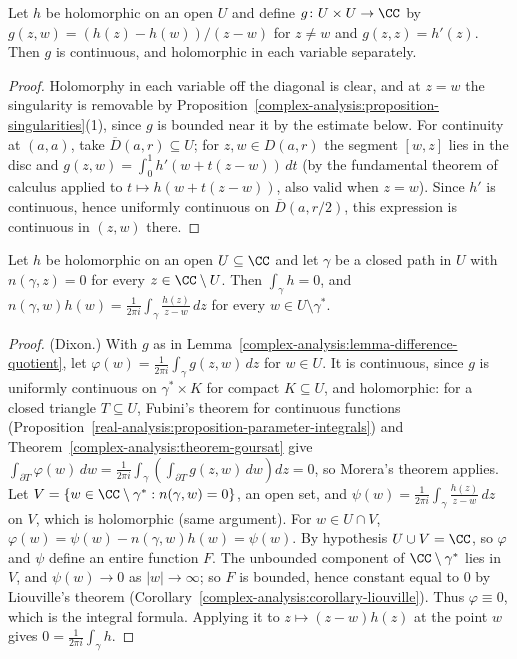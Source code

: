 \begin{lemma}\label{complex-analysis:lemma-difference-quotient}
Let $h$ be holomorphic on an open $U$ and define $g \colon U \times U \to \CC$ by $g(z, w) = (h(z) - h(w))/(z - w)$ for $z \neq w$ and $g(z, z) = h'(z)$. Then $g$ is continuous, and holomorphic in each
variable separately.
\end{lemma}

\begin{proof}
Holomorphy in each variable off the diagonal is clear, and at $z = w$ the singularity is removable by Proposition~\ref{complex-analysis:proposition-singularities}(1), since $g$ is bounded near it by the
estimate below. For continuity at $(a, a)$, take $\overline{D}(a, r) \subseteq U$; for $z, w \in D(a, r)$ the segment $[w, z]$ lies in the disc and
$g(z, w) = \int_0^1h'(w + t(z - w))\,dt$ (by the fundamental theorem of calculus applied to $t \mapsto h(w + t(z - w))$, also valid when $z = w$). Since $h'$ is continuous, hence uniformly continuous on
$\overline{D}(a, r/2)$, this expression is continuous in $(z, w)$ there.
\end{proof}

\begin{theorem}\label{complex-analysis:theorem-cauchy-homology}
Let $h$ be holomorphic on an open $U \subseteq \CC$ and let $\gamma$ be a closed path in $U$ with $n(\gamma, z) = 0$ for every $z \in \CC \setminus U$. Then $\int_\gamma h = 0$, and
$n(\gamma, w)h(w) = \frac{1}{2\pi i}\int_\gamma\frac{h(z)}{z - w}\,dz$ for every $w \in U \setminus \gamma^*$.
\end{theorem}

\begin{proof}
(Dixon.) With $g$ as in Lemma~\ref{complex-analysis:lemma-difference-quotient}, let $\varphi(w) = \frac{1}{2\pi i}\int_\gamma g(z, w)\,dz$ for $w \in U$. It is continuous, since $g$ is uniformly continuous on
$\gamma^* \times K$ for compact $K \subseteq U$, and holomorphic: for a closed triangle $T \subseteq U$, Fubini's theorem for continuous functions
(Proposition~\ref{real-analysis:proposition-parameter-integrals}) and Theorem~\ref{complex-analysis:theorem-goursat} give
$\int_{\partial T}\varphi(w)\,dw = \frac{1}{2\pi i}\int_\gamma\left(\int_{\partial T}g(z, w)\,dw\right)dz = 0$, so Morera's theorem applies. Let $V = \{w \in \CC \setminus \gamma^* : n(\gamma, w) = 0\}$, an open set,
and $\psi(w) = \frac{1}{2\pi i}\int_\gamma\frac{h(z)}{z - w}\,dz$ on $V$, which is holomorphic (same argument). For $w \in U \cap V$,
$\varphi(w) = \psi(w) - n(\gamma, w)h(w) = \psi(w)$. By hypothesis $U \cup V = \CC$, so $\varphi$ and $\psi$ define an entire function $F$. The unbounded component of $\CC \setminus \gamma^*$ lies in $V$, and
$\psi(w) \to 0$ as $|w| \to \infty$; so $F$ is bounded, hence constant equal to $0$ by Liouville's theorem (Corollary~\ref{complex-analysis:corollary-liouville}). Thus $\varphi \equiv 0$, which is the integral
formula. Applying it to $z \mapsto (z - w)h(z)$ at the point $w$ gives $0 = \frac{1}{2\pi i}\int_\gamma h$.
\end{proof}

